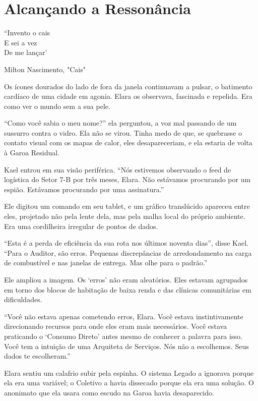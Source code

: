 
\chapter{Alcançando a Ressonância}
\epigraph{``Invento o cais \\ E sei a vez \\ De me lançar'}{Milton Nascimento, "Cais"}

Os ícones dourados do lado de fora da janela continuavam a pulsar, o batimento cardíaco de uma cidade em agonia. Elara os observava, fascinada e repelida. Era como ver o mundo sem a sua pele.

``Como você sabia o meu nome?'' ela perguntou, a voz mal passando de um sussurro contra o vidro. Ela não se virou. Tinha medo de que, se quebrasse o contato visual com os mapas de calor, eles desapareceriam, e ela estaria de volta à Garoa Residual.

Kael entrou em sua visão periférica. ``Nós estivemos observando o feed de logística do Setor 7-B por três meses, Elara. Não estávamos procurando por um espião. Estávamos procurando por uma assinatura.''

Ele digitou um comando em seu tablet, e um gráfico translúcido apareceu entre eles, projetado não pela lente dela, mas pela malha local do próprio ambiente. Era uma cordilheira irregular de pontos de dados.

``Esta é a perda de eficiência da sua rota nos últimos noventa dias'', disse Kael. ``Para o Auditor, são erros. Pequenas discrepâncias de arredondamento na carga de combustível e nas janelas de entrega. Mas olhe para o padrão.''

Ele ampliou a imagem. Os `erros' não eram aleatórios. Eles estavam agrupados em torno dos blocos de habitação de baixa renda e das clínicas comunitárias em dificuldades.

``Você não estava apenas cometendo erros, Elara. Você estava instintivamente direcionando recursos para onde eles eram mais necessários. Você estava praticando o `Consumo Direto' antes mesmo de conhecer a palavra para isso. Você tem a intuição de uma Arquiteta de Serviços. Nós não a escolhemos. Seus dados te escolheram.''

Elara sentiu um calafrio subir pela espinha. O sistema Legado a ignorava porque ela era uma variável; o Coletivo a havia dissecado porque ela era uma solução. O anonimato que ela usara como escudo na Garoa havia desaparecido.

